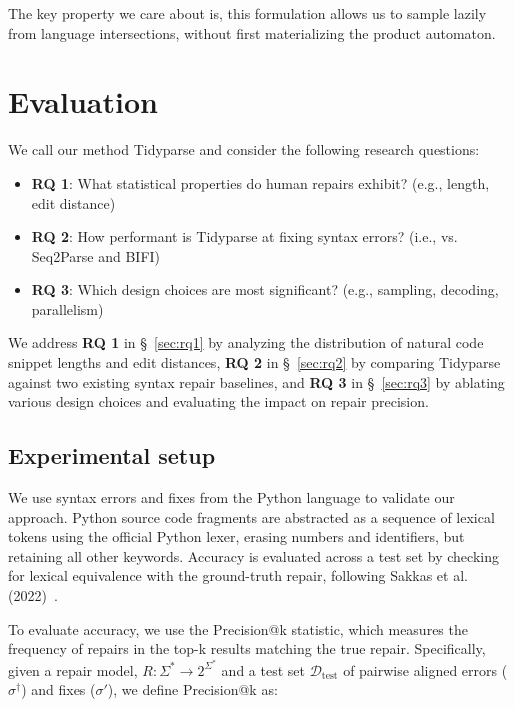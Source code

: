 \documentclass[runningheads]{llncs}
\begin{document}
The key property we care about is, this formulation allows us to sample lazily from language intersections, without first materializing the product automaton.

\section{Evaluation}

We call our method Tidyparse and consider the following research questions:

\begin{itemize}
\item \textbf{RQ 1}: What statistical properties do human repairs exhibit? (e.g., length, edit distance)
\item \textbf{RQ 2}: How performant is Tidyparse at fixing syntax errors? (i.e., vs. Seq2Parse and BIFI)
\item \textbf{RQ 3}: Which design choices are most significant? (e.g., sampling, decoding, parallelism)
\end{itemize}

We address \textbf{RQ 1} in \S~\ref{sec:rq1} by analyzing the distribution of natural code snippet lengths and edit distances, \textbf{RQ 2} in \S~\ref{sec:rq2} by comparing Tidyparse against two existing syntax repair baselines, and \textbf{RQ 3} in \S~\ref{sec:rq3} by ablating various design choices and evaluating the impact on repair precision.

  \subsection{Experimental setup}

  We use syntax errors and fixes from the Python language to validate our approach.  Python source code fragments are abstracted as a sequence of lexical tokens using the official Python lexer, erasing numbers and identifiers, but retaining all other keywords. Accuracy is evaluated across a test set by checking for lexical equivalence with the ground-truth repair, following Sakkas et al. (2022)~\cite{sakkas2022seq2parse}.

  To evaluate accuracy, we use the Precision@k statistic, which measures the frequency of repairs in the top-k results matching the true repair. Specifically, given a repair model, $R: \Sigma^* \rightarrow 2^{\Sigma^*}$ and a test set $\mathcal{D}_{\text{test}}$ of pairwise aligned errors ($\sigma^\dagger$) and fixes ($\sigma'$), we define Precision@k as:
\end{document}
